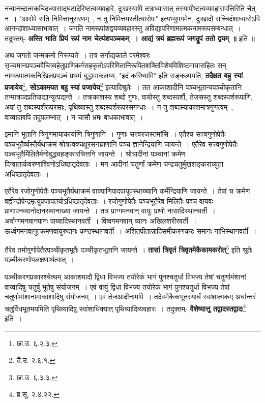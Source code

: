 	नन्वानन्दात्मकचिदध्यासाद्घटादेरिष्टत्वव्यवहारे, दुःखस्यापि तत्राध्यासात् तस्यापीष्टत्वव्यवहारापत्तिरिति चेत् न~। "आरोपे सति निमित्तानुसरणम्~, न तु निमित्तमस्तीत्यारोपः" इत्यभ्युपगमेन, दुःखादौ सच्चिदंशाध्यासेऽपि आनन्दांशाध्यासाभावात्~। जगति नामरूपांशद्वयव्यवहारस्तु अविद्यापरिणामात्मकनामरूपसम्बन्धात्~। तदुक्तम्- {\bfseries अस्ति भाति प्रियं रूपं नाम चेत्यंशपञ्चकम्~। आद्यं त्रयं ब्रह्मरूपं जगद्रूपं ततो द्वयम् ॥} इति ॥\par
	अथ जगतो जन्मक्रमो निरूप्यते~। तत्र सर्गाद्यकाले परमेश्वरः सृज्यमानप्रपञ्चवैचित्र्यहेतुप्राणिकर्मसहकृतोऽपरिमितानिरूपितशक्तिविशेषविशिष्टमायासहितः सन् नामरूपात्मकनिखिलप्रपञ्चं प्रथमं बुद्धावाकलय्य, "इदं करिष्यामि" इति सङ्कल्पयति, {\bfseries तदैक्षत बहु स्यां प्रजायेय}\footnote{छा.उ. ६.२.३.}, {\bfseries सोऽकामयत बहु स्यां प्रजायेय}\footnote{तै.उ. २.६.१.} इत्यादिश्रुतेः~। तत आकाशादीनि पञ्चभूतान्यपञ्चीकृतानि तन्मात्रपदप्रतिपाद्यान्युत्पद्यन्ते~। तत्राकाशस्य शब्दो गुणः, वायोस्तु शब्दस्पर्शौ, तेजसस्तु शब्दस्पर्शरूपाणि, अपां तु शब्दस्पर्शरूपरसाः, पृथिव्यास्तु शब्दस्पर्शरूपरसगन्धाः~। न तु शब्दस्याकाशमात्रगुणत्वम्~, वाय्वादावपि तदुपलम्भात्~। न चासौ भ्रमः बाधकाभावात्~।\par
	इमानि भूतानि त्रिगुणमायाकार्याणि त्रिगुणानि~। गुणाः सत्त्वरजस्तमांसि~। एतैश्च सत्त्वगुणोपेतैः पञ्चभूतैर्व्यस्तैर्यथाक्रमं श्रोत्रत्वक्चक्षूरसनघ्राणानि पञ्च ज्ञानेन्द्रियाणि जायन्ते~। एतैरेव सत्त्वगुणोपेतैः पञ्चभूतैर्मिलितैर्मनोबुद्ध्यहङ्कारचित्तनि जायन्ते~। श्रोत्रादीनां पञ्चानां क्रमेण दिग्वातार्कवरुणाश्विनोऽधिष्ठातृदेवताः~। मन आदीनां चतुर्णां क्रमेण चन्द्रचतुर्मुखशङ्कराच्युता अधिष्ठातृदेवताः~।\par
	एतैरेव रजोगुणोपेतैः पञ्चभूतैर्यथाक्रमं वाक्पाणिपादपायूपस्थाख्यानि कर्मेन्द्रियाणि जायन्ते~। तेषां च क्रमेण वह्नीन्द्रोपेन्द्रमृत्युप्रजापतयोऽधिष्ठातृदेवताः~। रजोगुणोपेतैः पञ्चभूतैरेव मिलितैः पञ्च वायवः प्राणापनव्यानोदानसमानाख्या जायन्ते~। तत्र प्राग्गमनवान् वायुः प्राणो नासादिस्थानवर्ती~। अर्वाग्गमनवानपानः पाय्वादिस्थानवर्ती~। विष्वगमनवान् व्यानः अखिलशरीरवर्ती~। ऊर्ध्वगमनवानुत्क्रमणवायुरुदानः कण्ठस्थानवर्ती~। अशितपीतान्नादिसमीकरणकरः समानः नाभिस्थानवर्ती~।\par
	तैरेव तमोगुणोपेतैरपञ्चीकृतभूतैः पञ्चीकृतभूतानि जायन्ते~। {\bfseries तासां त्रिवृतं त्रिवृतमेकैकामकरोत्}\footnote{छा.उ. ६.३.३.} इति श्रुतेः पञ्चीकरणोपलक्षणार्थत्वात्~।\par
	पञ्चीकरणप्रकारश्चेत्थम् आकाशमादौ द्विधा विभज्य तयोरेकं भागं पुनश्चतुर्धा विभज्य तेषां चतुर्णामंशानां वाय्वादिषु चतुर्षु भूतेषु संयोजनम्~। एवं वायुं द्विधा विभज्य तयोरेकं भागं पुनश्चतुर्धा विभज्य तेषां चतुर्णामांशानामाकाशादिषु संयोजनम्~। एवं तेजआदीनामपि~। तदेवमेकैकभूतस्यार्धं स्वांशात्मकम् अर्धान्तरं चतुर्विधभूतमयमिति पृथिव्यादिषु स्वांशाधिक्यात् पृथिव्यादिव्यवहारः~। तदुक्तम्- {\bfseries वैशेष्यात्तु तद्वादस्तद्वादः}\footnote{ब्र.सू. २.४.२२.} इति~।\par

